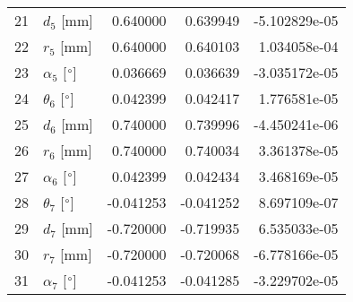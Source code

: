 \documentclass{standalone}%
\begin{document}
\begin{tabular}{llrrr}
21 &              $d_{5}$ [mm] &  0.640000 &   0.639949 & -5.102829e-05 \\
22 &              $r_{5}$ [mm] &  0.640000 &   0.640103 &  1.034058e-04 \\
23 &  $\alpha_{5}$ [$\degree$] &  0.036669 &   0.036639 & -3.035172e-05 \\
24 &  $\theta_{6}$ [$\degree$] &  0.042399 &   0.042417 &  1.776581e-05 \\
25 &              $d_{6}$ [mm] &  0.740000 &   0.739996 & -4.450241e-06 \\
26 &              $r_{6}$ [mm] &  0.740000 &   0.740034 &  3.361378e-05 \\
27 &  $\alpha_{6}$ [$\degree$] &  0.042399 &   0.042434 &  3.468169e-05 \\
28 &  $\theta_{7}$ [$\degree$] & -0.041253 &  -0.041252 &  8.697109e-07 \\
29 &              $d_{7}$ [mm] & -0.720000 &  -0.719935 &  6.535033e-05 \\
30 &              $r_{7}$ [mm] & -0.720000 &  -0.720068 & -6.778166e-05 \\
31 &  $\alpha_{7}$ [$\degree$] & -0.041253 &  -0.041285 & -3.229702e-05 \\
\bottomrule
\end{tabular}
%
\end{document}
